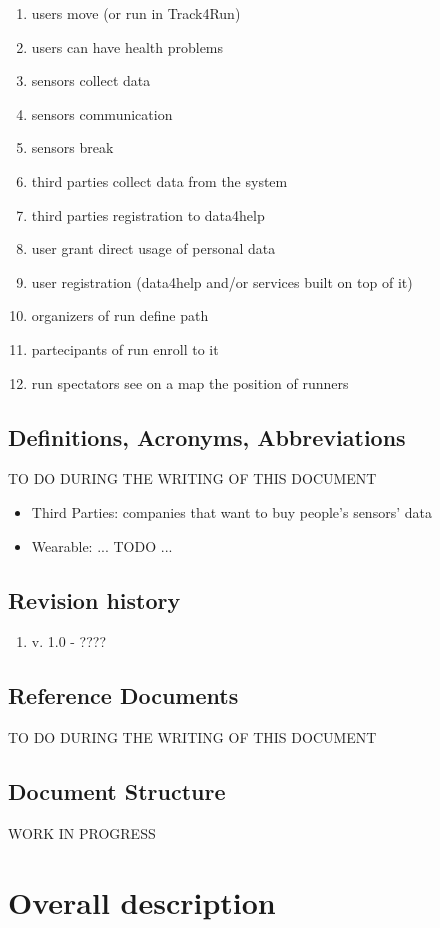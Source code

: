 \documentclass{report}
\begin{document}
		\begin{enumerate}
		\item users move (or run in Track4Run)
		\item users can have health problems
		\item sensors collect data
		\item sensors communication
		\item sensors break
		\item third parties collect data from the system
		\item third parties registration to data4help
		\item user grant direct usage of personal data
		\item user registration (data4help and/or services built on top of it)
		\item organizers of run define path
		\item partecipants of run enroll to it
		\item run spectators see on a map the position of runners
		
		\end{enumerate}
		\section{Definitions, Acronyms, Abbreviations}
		TO DO DURING THE WRITING OF THIS DOCUMENT
		\begin{itemize}
		\item Third Parties: companies that want to buy people's sensors' data
		\item Wearable: ... TODO ...
		\end{itemize}
		\section{Revision history}
		\begin{enumerate}
			\item v. 1.0 - ????
		\end{enumerate}
		\section{Reference Documents}
		TO DO DURING THE WRITING OF THIS DOCUMENT
		\section{Document Structure}
		WORK IN PROGRESS
	\chapter{Overall description}
\end{document}
